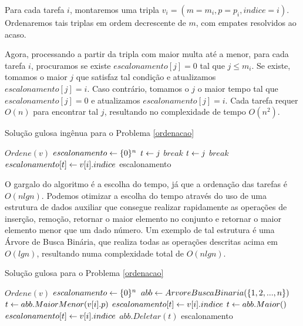 Para cada tarefa $i$, montaremos uma tripla $v_i = (m = m_i, p = p_i, indice = i)$. Ordenaremos tais triplas em ordem decrescente de $m$, com empates resolvidos ao acaso. 

Agora, processando a partir da tripla com maior multa até a menor, para cada tarefa $i$, procuramos se existe $escalonamento[j] = 0$ tal que $j \leq m_i$. Se existe, tomamos o maior $j$ que satisfaz tal condição e atualizamos $escalonamento[j] = i$. Caso contrário, tomamos o $j$ o maior tempo tal que $escalonamento[j] = 0$ e atualizamos $escalonamento[j] = i$. Cada tarefa requer $O(n)$ para encontrar tal $j$, resultando no complexidade de tempo $O(n^2)$.

\begin{algorithm}[H]
\caption{Solução gulosa ingênua para o Problema \ref{ordenacao}}
\label{ordenacao:code_naive}
\begin{algorithmic}[1]
    \State $Ordene(v)$
    \State $escalonamento \leftarrow \{0\}^n$
                \State $t \leftarrow j$
                \State $break$
            \EndIf
        \EndFor
                \State $t \leftarrow j$
                \State $break$
            \EndIf
        \EndFor
        \State $escalonamento[t] \leftarrow v[i].indice$
    \EndFor
    \State \Return escalonamento
\EndFunction
\end{algorithmic}
\end{algorithm}

O gargalo do algoritmo é a escolha do tempo, já que a ordenação das tarefas é $O(nlgn)$. Podemos otimizar a escolha do tempo através do uso de uma estrutura de dados auxiliar que consegue realizar rapidamente as operações de inserção, remoção, retornar o maior elemento no conjunto e retornar o maior elemento menor que um dado número. Um exemplo de tal estrutura é uma Árvore de Busca Binária, que realiza todas as operações descritas acima em $O(lgn)$, resultando numa complexidade total de $O(nlgn)$.

\begin{algorithm}[H]
\caption{Solução gulosa para o Problema \ref{ordenacao}}
\label{ordenacao:code}
\begin{algorithmic}[1]
    \State $Ordene(v)$
    \State $escalonamento \leftarrow \{0\}^n$
    \State $abb \leftarrow ArvoreBuscaBinaria(\{1, 2, ..., n\})$
        \State $t \leftarrow abb.MaiorMenor(v[i].p)$
            \State $escalonamento[t] \leftarrow v[i].indice$
        \Else
            \State $t \leftarrow abb.Maior()$
            \State $escalonamento[t] \leftarrow v[i].indice$
        \EndIf
        \State $abb.Deletar(t)$
    \EndFor
    \State \Return escalonamento
\EndFunction
\end{algorithmic}
\end{algorithm}

